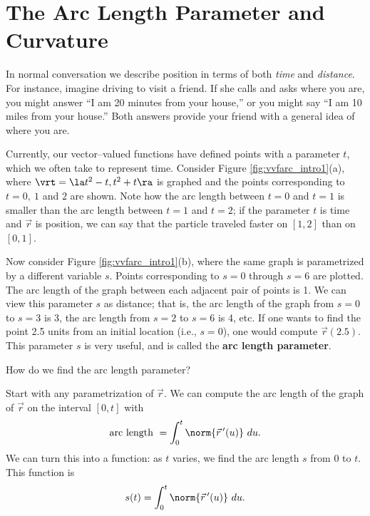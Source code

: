 \section{The Arc Length Parameter and Curvature}\label{sec:curvature}

In normal conversation we describe position in terms of both \emph{time} and \emph{distance}. For instance, imagine driving to visit a friend. If she calls and asks where you are, you might answer ``I am 20 minutes from your house,'' or you might say ``I am 10 miles from your house.'' Both answers provide your friend with a general idea of where you are.

Currently, our vector--valued functions have defined points with a parameter $t$, which we often take to represent time. Consider Figure \ref{fig:vvfarc_intro1}(a), where $\vrt = \la t^2-t,t^2+t\ra$ is graphed and the points corresponding to $t=0,\ 1$ and $2$ are shown. Note how the arc length between $t=0$ and $t=1$ is smaller than the arc length between $t=1$ and $t=2$; if the parameter $t$ is time and $\vec r$ is position, we can say that the particle traveled faster on $[1,2]$ than on $[0,1]$. 

Now consider Figure \ref{fig:vvfarc_intro1}(b), where the same graph is parametrized by a different variable $s$.  Points corresponding to $s=0$ through $s=6$ are plotted. The arc length of the graph between each adjacent pair of points is 1. We can view this parameter $s$ as distance; that is, the arc length of the graph from $s=0$ to $s=3$ is 3, the arc length from $s=2$ to $s=6$ is 4, etc. If one wants to find the point 2.5 units from an initial location (i.e., $s=0$), one would compute $\vec r(2.5)$. This parameter $s$ is very useful, and is called the \textbf{arc length parameter}.

How do we find the arc length parameter? 

Start with any parametrization of $\vec r$. We can compute the arc length of the graph of $\vec r$ on the interval $[0,t]$ with $$\text{arc length } = \int_0^t\norm{\vec r\,'(u)}\ du.$$ We can turn this into a function: as $t$ varies, we find the arc length $s$ from $0$ to $t$. This function is
\begin{equation}
s(t) = \int_0^t \norm{\vec r\,'(u)}\ du.\label{eq:vvfarc}
\end{equation}

